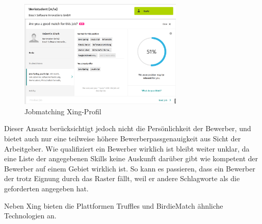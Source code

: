 \begin{figure}[htb]
 \centering
 \includegraphics[width=0.7\textwidth,angle=0]{abb/xing_jobmatching}
 \caption[Beschreibung]{Jobmatching Xing-Profil}
\label{fig:Beschreibung}
\end{figure}

Dieser Ansatz berücksichtigt jedoch nicht die Persönlichkeit der Bewerber, und bietet auch nur eine teilweise höhere Bewerberpassgenauigkeit aus Sicht der Arbeitgeber. Wie qualifiziert ein Bewerber wirklich ist bleibt weiter unklar, da eine Liste der angegebenen Skills keine Auskunft darüber gibt wie kompetent der Bewerber auf einem Gebiet wirklich ist. So kann es passieren, dass ein Bewerber der trotz Eignung durch das Raster fällt, weil er andere Schlagworte als die geforderten angegeben hat.

Neben Xing bieten die Plattformen Truffles und BirdieMatch ähnliche Technologien an.




